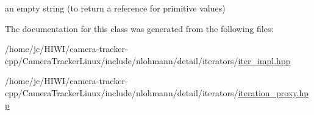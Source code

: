 an empty string (to return a reference for primitive values) 



The documentation for this class was generated from the following files\+:\begin{DoxyCompactItemize}
\item 
/home/jc/\+H\+I\+W\+I/camera-\/tracker-\/cpp/\+Camera\+Tracker\+Linux/include/nlohmann/detail/iterators/\hyperlink{iter__impl_8hpp}{iter\+\_\+impl.\+hpp}\item 
/home/jc/\+H\+I\+W\+I/camera-\/tracker-\/cpp/\+Camera\+Tracker\+Linux/include/nlohmann/detail/iterators/\hyperlink{iteration__proxy_8hpp}{iteration\+\_\+proxy.\+hpp}\end{DoxyCompactItemize}
